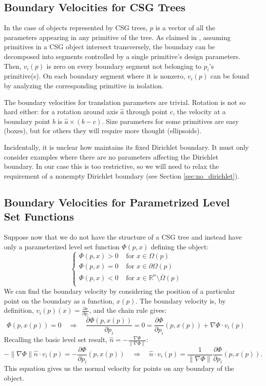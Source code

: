 \documentclass[10pt]{article}
\providecommand{\norm}[1]{\lVert#1\rVert}
\providecommand{\shape}{\Omega(p)}
\providecommand{\boundary}{\partial \shape}
\providecommand{\pder}[2]{\frac{\partial #1}{\partial #2}}
\begin{document}
\subsection{Boundary Velocities for CSG Trees}
\label{sub:For CSG Trees}
In the case of objects represented by CSG trees, $p$ is a vector of all the
parameters appearing in any primitive of the tree. As claimed in
\cite{Chen:2007}, assuming primitives in a CSG object intersect
transversely, the boundary can be decomposed into segments controlled by a
single primitive's design parameters. Then, $v_i(p)$ is zero on every
boundary segment not belonging to $p_i$'s primitive(s). On each boundary
segment where it is nonzero, $v_i(p)$ can be found by analyzing the
corresponding primitive in isolation.

The boundary velocities for translation parameters are trivial. Rotation is not
so hard either: for a rotation around axis $\hat{a}$ through point $c$, the
velocity at a boundary point $b$ is $\hat{a} \times (b - c)$. Size parameters
for some primitives are easy (boxes), but for others they will require more
thought (ellipsoids).

Incidentally, it is unclear how \cite{Chen:2007} maintains its fixed Dirichlet
boundary. It must only consider examples where there are no parameters affecting
the Dirichlet boundary. In our case this is too restrictive, so we will need to
relax the requirement of a nonempty Dirichlet boundary (see Section
\ref{sec:no_dirichlet}).

\subsection{Boundary Velocities for Parametrized Level Set Functions} %
\label{sub:Gradients for Arbitrary Level Set Functions}
Suppose now that we do not have the structure of a CSG tree and instead have
only a parameterized level set function $\Phi(p, x)$ defining the object:
$$
    \begin{cases}
        \Phi(p, x) > 0 &\text{ for } x \in \shape \\
        \Phi(p, x) = 0 &\text{ for } x \in \boundary \\
        \Phi(p, x) < 0 &\text{ for } x \in \mathbb{R}^n \setminus \overline{\Omega}(p) \\
    \end{cases}
$$
We can find the boundary velocity by considering the position of a particular point
on the boundary as a function, $x(p)$. The boundary velocity is, by definition, $v_i(p)(x)
= \pder{x}{p_i}$, and the chain rule gives:
$$
\Phi(p, x(p)) = 0 \quad \Longrightarrow \quad \pder{\Phi(p, x(p))}{p_i} = 0 =
\pder{\Phi}{p_i}(p, x(p)) + \nabla \Phi \cdot v_i(p)\
$$
Recalling the basic level set result, $\hat{n} = -\frac{\nabla \Phi}{\norm{\nabla \Phi}}$:
$$
-\norm{\nabla \Phi} \hat{n} \cdot v_i(p) = -\pder{\Phi}{p_i}(p, x(p))  \quad \Longrightarrow \quad
\hat{n} \cdot v_i(p) = \frac{1}{\norm{\nabla \Phi}} \pder{\Phi}{p_i}(p, x(p)).
$$
This equation gives us the normal velocity for points on any boundary of the object.
\end{document}
